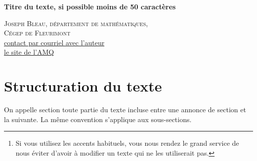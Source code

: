 \begin{center}
\textsf{\LARGE \textbf{Titre du texte, si possible moins de 50 caractères}}
\end{center}

\begin{flushright}
\textsc{Joseph Bleau, département de mathématiques,\\
C\'{e}gep de Fleurimont}\\
\href{mailto:jo-bleau@cegepfleurimont.qc.ca}{contact par courriel avec l'auteur}\\
  \href{http://archimede.mat.ulaval.ca/amq/}{le site de l'AMQ}\\
\end{flushright}

\baselineskip


\begin{abstract}

Dans ce Gabarit, on devra entrer tous les textes en caractères accentués, comme à l'habitude\footnote{Si vous utilisez les accents habituels, vous nous rendez le grand service de nous éviter d’avoir à modifier un texte qui ne les utiliserait pas.}.\\
 Le résumé apparaît ici. Long d'au maximum 100 mots, il peut contenir des expressions en  {\em italique}, en {\bf caractères gras}, entre \og guillemets\fg~ou en  \textsc {petites capitales}. On peut aussi utiliser des symboles particuliers comme $\Bbb{R}$ ,  $\mathscr{F}$ ou encore $\mathscr{P}(E)$ et même des expressions mathématiques comme $f_k(x)=a x^2+bx+c$, ou encore  «  l’ensemble $\mathfrak{F}$ des formules du système formel $\mathfrak{L}$ est bien défini ».

Il est possible de reculer dans le temps. Ainsi, on peut parler du   siècle de notre ère ou des   et   siècles.


\end{abstract}


\bigskip



\section{Structuration du texte}\label{sec1}
\bigskip
\bigskip
\begin{definition}
On appelle section toute partie du texte incluse entre une annonce de section et la suivante. La même convention s'applique aux sous-sections.
\end{definition}

